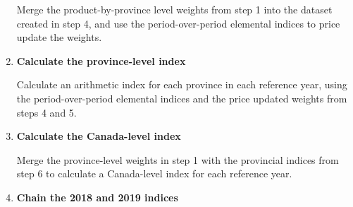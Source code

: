 \documentclass[]{article}
\newenvironment{Shaded}{\begin{snugshade}}{\end{snugshade}}
\newcommand{\CommentTok}[1]{\textcolor[rgb]{0.56,0.35,0.01}{\textit{#1}}}
\newcommand{\DataTypeTok}[1]{\textcolor[rgb]{0.13,0.29,0.53}{#1}}
\newcommand{\DecValTok}[1]{\textcolor[rgb]{0.00,0.00,0.81}{#1}}
\newcommand{\KeywordTok}[1]{\textcolor[rgb]{0.13,0.29,0.53}{\textbf{#1}}}
\newcommand{\NormalTok}[1]{#1}
\newcommand{\OperatorTok}[1]{\textcolor[rgb]{0.81,0.36,0.00}{\textbf{#1}}}
\newcommand{\OtherTok}[1]{\textcolor[rgb]{0.56,0.35,0.01}{#1}}
\newcommand{\StringTok}[1]{\textcolor[rgb]{0.31,0.60,0.02}{#1}}
\begin{document}
\begin{enumerate}
  Merge the product-by-province level weights from step 1 into the dataset created in step 4, and use the period-over-period elemental indices to price update the weights.

\begin{Shaded}
\end{Shaded}
\item
  \textbf{Calculate the province-level index}

  Calculate an arithmetic index for each province in each reference year, using the period-over-period elemental indices and the price updated weights from steps 4 and 5.

\begin{Shaded}
\end{Shaded}
\item
  \textbf{Calculate the Canada-level index}

  Merge the province-level weights in step 1 with the provincial indices from step 6 to calculate a Canada-level index for each reference year.

\begin{Shaded}
\end{Shaded}
\item
  \textbf{Chain the 2018 and 2019 indices}


\end{enumerate}
\end{document}

